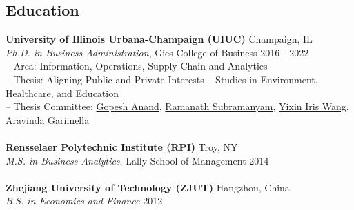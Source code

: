 \documentclass[margin,line]{resume}
\begin{document}
\begin{resume}
 	  \section{\mysidestyle Education} 
         \textbf{University of Illinois Urbana-Champaign (UIUC)} \hfill Champaign, IL\\
         {\sl Ph.D. in Business Administration}, Gies College of Business \hfill 2016 - 2022\\%
         -- Area: Information, Operations, Supply Chain and Analytics\\
         -- Thesis: Aligning Public and Private Interests -- Studies in Environment, Healthcare, and Education\\
         -- Thesis Committee: \href{https://giesbusiness.illinois.edu/profile/gopesh-anand}{Gopesh Anand}, 
         \href{https://giesbusiness.illinois.edu/profile/ramanath-subramanyam}{Ramanath Subramanyam}, 
         \href{https://giesbusiness.illinois.edu/profile/yixin-iris-wang}{Yixin Iris Wang},
         \href{https://giesbusiness.illinois.edu/profile/aravinda-ari-garimella}{Aravinda Garimella}\\
         \\
         \textbf{Rensselaer Polytechnic Institute (RPI)} \hfill Troy, NY\\
         {\sl M.S. in Business Analytics}, Lally School of Management \hfill 2014\\
         \\
         \textbf{Zhejiang University of Technology (ZJUT)} \hfill Hangzhou, China\\
         {\sl B.S. in Economics and Finance} \hfill 2012
   

\end{resume}
\end{document}
